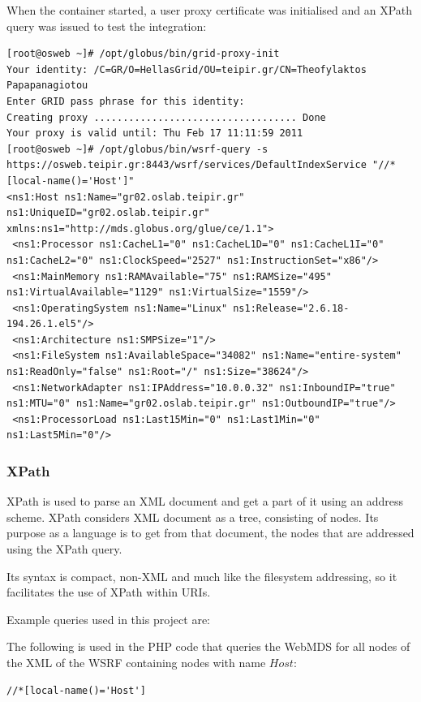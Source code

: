 When the container started, a user proxy certificate was initialised and an XPath query was issued to test the integration:
 
\begin{lstlisting}[caption=WSRF command line query]
[root@osweb ~]# /opt/globus/bin/grid-proxy-init
Your identity: /C=GR/O=HellasGrid/OU=teipir.gr/CN=Theofylaktos Papapanagiotou
Enter GRID pass phrase for this identity:
Creating proxy ................................... Done
Your proxy is valid until: Thu Feb 17 11:11:59 2011
[root@osweb ~]# /opt/globus/bin/wsrf-query -s https://osweb.teipir.gr:8443/wsrf/services/DefaultIndexService "//*[local-name()='Host']"
<ns1:Host ns1:Name="gr02.oslab.teipir.gr" ns1:UniqueID="gr02.oslab.teipir.gr" xmlns:ns1="http://mds.globus.org/glue/ce/1.1">
 <ns1:Processor ns1:CacheL1="0" ns1:CacheL1D="0" ns1:CacheL1I="0" ns1:CacheL2="0" ns1:ClockSpeed="2527" ns1:InstructionSet="x86"/>
 <ns1:MainMemory ns1:RAMAvailable="75" ns1:RAMSize="495" ns1:VirtualAvailable="1129" ns1:VirtualSize="1559"/>
 <ns1:OperatingSystem ns1:Name="Linux" ns1:Release="2.6.18-194.26.1.el5"/>
 <ns1:Architecture ns1:SMPSize="1"/>
 <ns1:FileSystem ns1:AvailableSpace="34082" ns1:Name="entire-system" ns1:ReadOnly="false" ns1:Root="/" ns1:Size="38624"/>
 <ns1:NetworkAdapter ns1:IPAddress="10.0.0.32" ns1:InboundIP="true" ns1:MTU="0" ns1:Name="gr02.oslab.teipir.gr" ns1:OutboundIP="true"/>
 <ns1:ProcessorLoad ns1:Last15Min="0" ns1:Last1Min="0" ns1:Last5Min="0"/>
\end{lstlisting}

\subsubsection{XPath}

XPath is used to parse an XML document and get a part of it using an address scheme. XPath considers XML document as a tree, consisting of nodes. Its purpose as a language is to get from that document, the nodes that are addressed using the XPath query.

Its syntax is compact, non-XML and much like the filesystem addressing, so it facilitates the use of XPath within URIs.

Example queries used in this project are:

The following is used in the PHP code that queries the WebMDS for all nodes of the XML of the WSRF containing nodes with name $Host$:
\begin{lstlisting}
//*[local-name()='Host']
\end{lstlisting}

